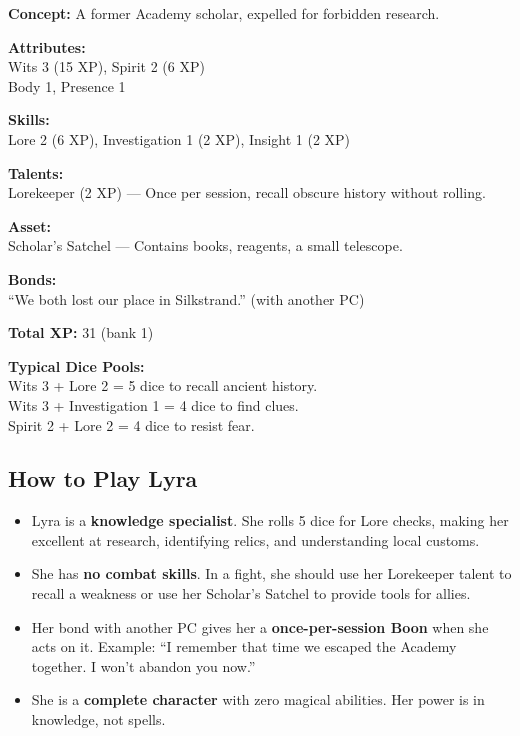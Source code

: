 \documentclass[10pt]{article}
\begin{document}
\begin{infobox}
\textbf{Concept:} A former Academy scholar, expelled for forbidden research.

\textbf{Attributes:} \\
Wits 3 (15 XP), Spirit 2 (6 XP) \\
Body 1, Presence 1

\textbf{Skills:} \\
Lore 2 (6 XP), Investigation 1 (2 XP), Insight 1 (2 XP)

\textbf{Talents:} \\
Lorekeeper (2 XP) --- Once per session, recall obscure history without rolling.

\textbf{Asset:} \\
Scholar's Satchel --- Contains books, reagents, a small telescope.

\textbf{Bonds:} \\
``We both lost our place in Silkstrand.'' (with another PC)

\textbf{Total XP:} 31 (bank 1)

\textbf{Typical Dice Pools:} \\
Wits 3 + Lore 2 = 5 dice to recall ancient history. \\
Wits 3 + Investigation 1 = 4 dice to find clues. \\
Spirit 2 + Lore 2 = 4 dice to resist fear.
\end{infobox}

\subsection*{How to Play Lyra}

\begin{itemize}
\item Lyra is a \textbf{knowledge specialist}. She rolls 5 dice for Lore checks, making her excellent at research, identifying relics, and understanding local customs.
\item She has \textbf{no combat skills}. In a fight, she should use her Lorekeeper talent to recall a weakness or use her Scholar's Satchel to provide tools for allies.
\item Her bond with another PC gives her a \textbf{once-per-session Boon} when she acts on it. Example: ``I remember that time we escaped the Academy together. I won't abandon you now.''
\item She is a \textbf{complete character} with zero magical abilities. Her power is in knowledge, not spells.
\end{itemize}
\end{document}
